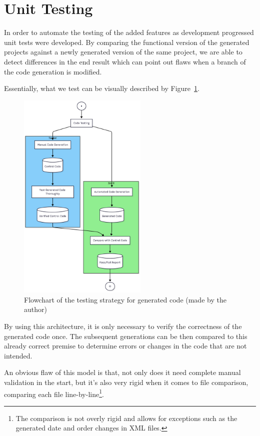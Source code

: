 \section{Unit Testing}
\label{sec:test_unit}

In order to automate the testing of the added features as development progressed unit tests were developed. By comparing the functional version of the generated projects against a newly generated version of the same project, we are able to detect differences in the end result which can point out flaws when a branch of the code generation is modified. 

Essentially, what we test can be visually described by Figure~\ref{fig:testingFlowchart}.

\begin{figure}[htbp]
	\centering
	\includegraphics[width=0.55\textwidth]{testingFlowchart.png}
	\caption{Flowchart of the testing strategy for generated code (made by the author)}
	\label{fig:testingFlowchart}
\end{figure}

By using this architecture, it is only necessary to verify the correctness of the generated code once. The subsequent generations can be then compared to this already correct premise to determine errors or changes in the code that are not intended.

An obvious flaw of this model is that, not only does it need complete manual validation in the start, but it's also very rigid when it comes to file comparison, comparing each file line-by-line\footnote{The comparison is not overly rigid and allows for exceptions such as the generated date and order changes in \gls{XML} files.}.


